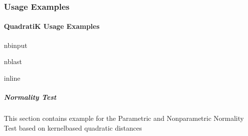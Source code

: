 \documentclass[letterpaper,10pt,english,openany,oneside]{sphinxmanual}
\begin{document}
\subsubsection{Usage Examples}
\label{\detokenize{user_guide/index:usage-examples}}
\sphinxstepscope


\paragraph{QuadratiK Usage Examples}
\label{\detokenize{user_guide/basic_usage:QuadratiK-Usage-Examples}}\label{\detokenize{user_guide/basic_usage::doc}}
\begin{sphinxuseclass}{nbinput}
\begin{sphinxuseclass}{nblast}
{
\begin{sphinxVerbatim}[commandchars=\\\{\}]
\llap{\color{nbsphinxin}[1]:\,\hspace{\fboxrule}\hspace{\fboxsep}} inline
   
   
   
\end{sphinxVerbatim}
}

\end{sphinxuseclass}
\end{sphinxuseclass}

\subparagraph{Normality Test}
\label{\detokenize{user_guide/basic_usage:Normality-Test}}
\sphinxAtStartPar
This section contains example for the Parametric and Non\sphinxhyphen{}parametric Normality Test based on kernel\sphinxhyphen{}based quadratic distances
\end{document}
